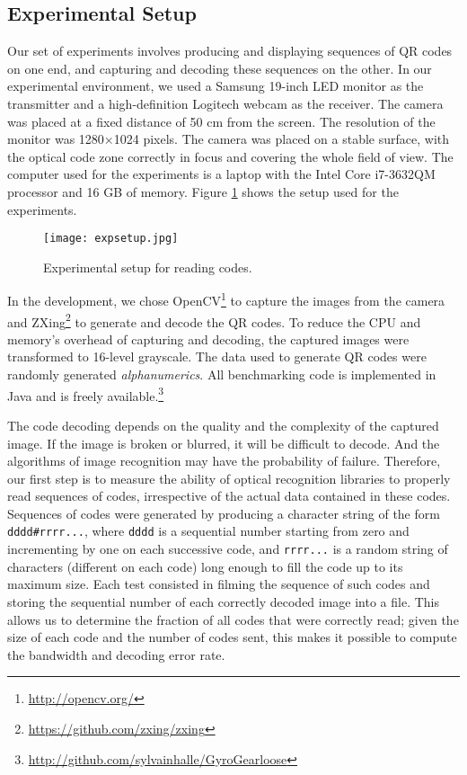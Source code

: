\subsection{Experimental Setup}

Our set of experiments involves producing and displaying sequences of QR codes on one end, and capturing and decoding these sequences on the other. In our experimental environment, we used a Samsung 19-inch LED monitor as the transmitter and a high-definition Logitech webcam as the receiver. The camera was placed at a fixed distance of 50 cm from the screen. The resolution of the monitor was 1280$\times$1024 pixels. %
The camera was placed on a stable surface, with the optical code zone correctly in focus and covering the whole field of view. The computer used for the experiments is a laptop with the Intel Core i7-3632QM processor and 16 GB of memory. Figure \ref{fig:qr:setup} shows the setup used for the experiments.

\begin{figure}
\centering
\texttt{[image: expsetup.jpg]}
\caption{Experimental setup for reading codes.}
\label{fig:qr:setup}
\end{figure}

In the development, we chose OpenCV\footnote{\url{http://opencv.org/}} to capture the images from the camera and ZXing\footnote{\url{https://github.com/zxing/zxing}} to generate and decode the QR codes. To reduce the CPU and memory's overhead of capturing and decoding, the captured images were transformed to 16-level grayscale. The data used to generate QR codes were randomly generated \emph{alphanumerics}. All benchmarking code is implemented in Java and is freely available.\footnote{\url{http://github.com/sylvainhalle/GyroGearloose}}

The code decoding depends on the quality and the complexity of the captured image. If the image is broken or blurred, it will be difficult to decode. And the algorithms of image recognition may have the probability of failure\cite{adel2006}. Therefore, our first step is to measure the ability of optical recognition libraries to properly read sequences of codes, irrespective of the actual data contained in these codes. Sequences of codes were generated by producing a character string of the form \verb+dddd#rrrr...+, where \verb+dddd+ is a sequential number starting from zero and incrementing by one on each successive code, and \verb+rrrr...+ is a random string of characters (different on each code) long enough to fill the code up to its maximum size. Each test consisted in filming the sequence of such codes and storing the sequential number of each correctly decoded image into a file. This allows us to determine the fraction of all codes that were correctly read; given the size of each code and the number of codes sent, this makes it possible to compute the bandwidth and decoding error rate.


